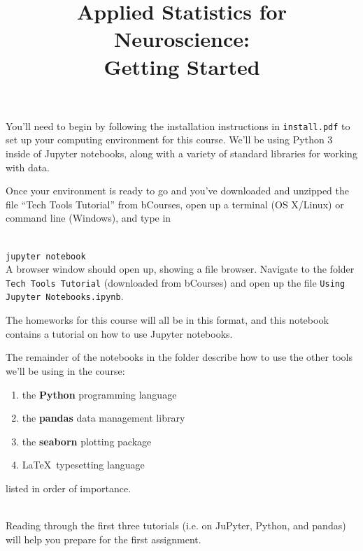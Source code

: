 \documentclass[twoside]{article}
\title{Applied Statistics for Neuroscience:\\
	Getting Started}
\begin{document}
\maketitle

You'll need to begin by following the installation instructions in
\texttt{install.pdf}
to set up your computing environment for this course.
We'll be using Python 3 inside of Jupyter notebooks,
along with a variety of standard libraries for working with data.

Once your environment is ready to go
and you've downloaded and unzipped
the file ``Tech Tools Tutorial'' from bCourses,
open up a terminal (OS X/Linux)
or command line (Windows),
and type in

\ \\
\texttt{jupyter notebook}
\ \\

A browser window should open up, showing a file browser.
Navigate to the folder \texttt{Tech Tools Tutorial}
(downloaded from bCourses)
and open up the file
\texttt{Using Jupyter Notebooks.ipynb}.

The homeworks for this course will all be in this format,
and this notebook contains a tutorial on how to use Jupyter notebooks.

The remainder of the notebooks in the folder describe how
to use the other tools we'll be using in the course:

\begin{enumerate}
\item the \textbf{Python} programming language
\item the \textbf{pandas} data management library
\item the \textbf{seaborn} plotting package
\item \LaTeX \ typesetting language
\end{enumerate}

listed in order of importance.

\ \\

Reading through the first three tutorials
(i.e. on JuPyter, Python, and pandas)
will help you prepare for the first assignment.
\end{document}
